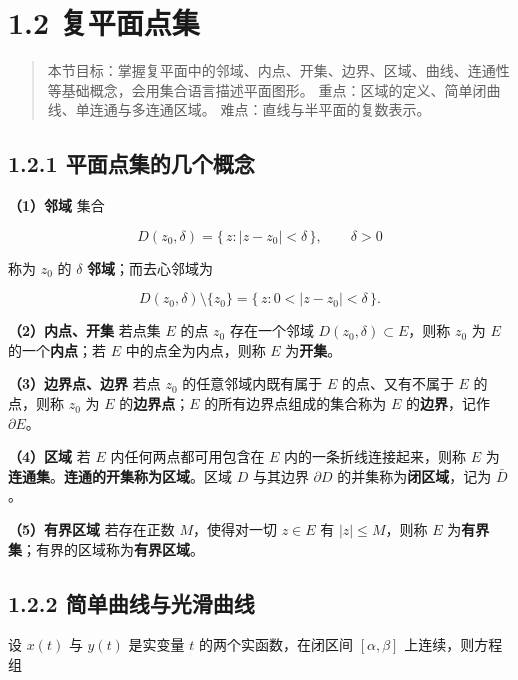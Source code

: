\section{1.2 复平面点集}\label{ux590dux5e73ux9762ux70b9ux96c6}

\begin{quote}
本节目标：掌握复平面中的邻域、内点、开集、边界、区域、曲线、连通性等基础概念，会用集合语言描述平面图形。
重点：区域的定义、简单闭曲线、单连通与多连通区域。
难点：直线与半平面的复数表示。
\end{quote}

\subsection{1.2.1
平面点集的几个概念}\label{ux5e73ux9762ux70b9ux96c6ux7684ux51e0ux4e2aux6982ux5ff5}

\textbf{（1）邻域} 集合

\[
D(z_0,\delta) = \{\, z : |z-z_0|<\delta\,\},\qquad \delta>0
\]

称为 \(z_0\) 的 \(\delta\) \textbf{邻域}；而去心邻域为

\[
D(z_0,\delta)\setminus\{z_0\} = \{\, z : 0<|z-z_0|<\delta\,\}.
\]

\textbf{（2）内点、开集} 若点集 \(E\) 的点 \(z_0\) 存在一个邻域
\(D(z_0,\delta)\subset E\)，则称 \(z_0\) 为 \(E\)
的一个\textbf{内点}；若 \(E\) 中的点全为内点，则称 \(E\)
为\textbf{开集}。

\textbf{（3）边界点、边界} 若点 \(z_0\) 的任意邻域内既有属于 \(E\)
的点、又有不属于 \(E\) 的点，则称 \(z_0\) 为 \(E\)
的\textbf{边界点}；\(E\) 的所有边界点组成的集合称为 \(E\)
的\textbf{边界}，记作 \(\partial E\)。

\textbf{（4）区域} 若 \(E\) 内任何两点都可用包含在 \(E\)
内的一条折线连接起来，则称 \(E\)
为\textbf{连通集}。\textbf{连通的开集称为区域}。区域 \(D\) 与其边界
\(\partial D\) 的并集称为\textbf{闭区域}，记为 \(\bar D\)。

\textbf{（5）有界区域} 若存在正数 \(M\)，使得对一切 \(z\in E\) 有
\(|z|\le M\)，则称 \(E\)
为\textbf{有界集}；有界的区域称为\textbf{有界区域}。

\subsection{1.2.2
简单曲线与光滑曲线}\label{ux7b80ux5355ux66f2ux7ebfux4e0eux5149ux6ed1ux66f2ux7ebf}

设 \(x(t)\) 与 \(y(t)\) 是实变量 \(t\) 的两个实函数，在闭区间
\([\alpha,\beta]\) 上连续，则方程组

